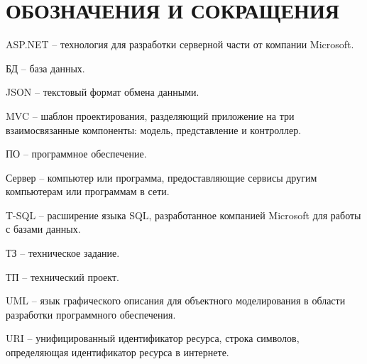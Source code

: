 \section*{ОБОЗНАЧЕНИЯ И СОКРАЩЕНИЯ}

ASP.NET -- технология для разработки серверной части от компании Microsoft.

БД -- база данных.

JSON -- текстовый формат обмена данными.

MVC -- шаблон проектирования, разделяющий приложение на три взаимосвязанные компоненты: модель, представление и контроллер.

ПО -- программное обеспечение.

Сервер -- компьютер или программа, предоставляющие сервисы другим компьютерам или программам в сети.

T-SQL -- расширение языка SQL, разработанное компанией Microsoft для работы с базами данных.

ТЗ -- техническое задание.

ТП -- технический проект.

UML -- язык графического описания для объектного моделирования в области разработки программного обеспечения.

URI -- унифицированный идентификатор ресурса, строка символов, определяющая идентификатор ресурса в интернете.
